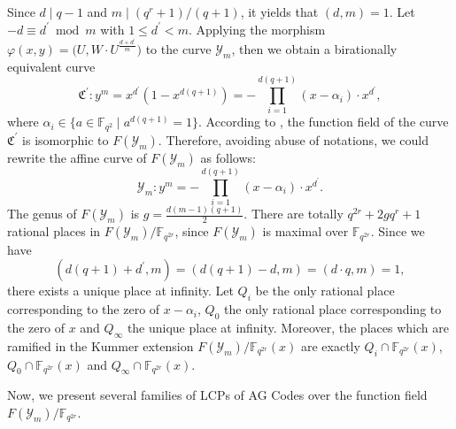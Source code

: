 \documentclass[journal,12pt,onecolumn]{IEEEtran}
\begin{document}
Since $d\mid q-1$ and $m\mid(q^r+1)/(q+1)$, it yields that $(d,m)=1$. Let $-d\equiv d^\prime \bmod m$ with $1\le d^\prime<m$. Applying the morphism $\varphi(x,y) = \big(U,  W\cdot U^{\frac{d+d^\prime}{m}}\big)$ to the curve $\mathcal{Y}_m$, then we obtain a birationally equivalent curve
\[
    \mathfrak{C}^\prime:y^m = x^{d^\prime}(1-x^{d(q+1)}) = - \prod_{i=1}^{d(q+1)}(x-\alpha_i)\cdot x^{d^\prime}, 
\]
where $\alpha_i\in \{ a\in\mathbb{F}_{q^2}\mid a^{d(q+1)} = 1 \}$. According to \cite[Cor. 4.5]{Algebraic_Geometry}, the function field of the curve $\mathfrak{C}^\prime$ is isomorphic to $F(\mathcal{Y}_m)$. Therefore, avoiding abuse of notations, we could rewrite the affine curve of $F(\mathcal{Y}_m)$ as follows:
\[
    \mathcal{Y}_m : y^m = - \prod_{i=1}^{d(q+1)}(x-\alpha_i)\cdot x^{d^\prime}. 
\]
The genus of $F(\mathcal{Y}_m)$ is $g=\frac{d(m-1)(q+1)}{2}$. There are totally $q^{2r}+2gq^r+1$ rational places in $F(\mathcal{Y}_m)/\mathbb{F}_{q^{2r}}$, since $F(\mathcal{Y}_m)$ is maximal over $\mathbb{F}_{q^{2r}}$. Since we have
\[
    (d(q+1)+d^\prime,m) = (d(q+1)-d,m) = (d\cdot q,m) = 1,
\]
there exists a unique place at infinity. Let $Q_i$ be the only rational place corresponding to the zero of $x-\alpha_i$, $Q_0$ the only rational place corresponding to the zero of $x$ and $Q_\infty$ the unique place at infinity. Moreover, the places which are ramified in the Kummer extension $F(\mathcal{Y}_m)/\mathbb{F}_{q^{2r}}(x)$ are exactly $Q_i\cap\mathbb{F}_{q^{2r}}(x)$, $Q_0\cap\mathbb{F}_{q^{2r}}(x)$ and $Q_\infty\cap\mathbb{F}_{q^{2r}}(x)$. 

Now, we present several families of LCPs of AG Codes over the function field $F(\mathcal{Y}_m)/\mathbb{F}_{q^{2r}}$.  
\end{document}
